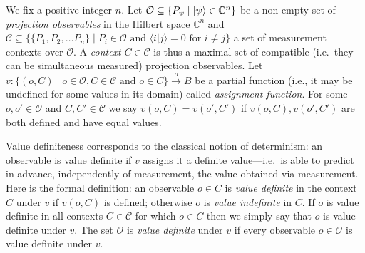 \documentclass[%
 preprint,
 showpacs,
 showkeys,
 preprintnumbers,
  amsmath,amssymb,
  aps,
 pra,
  longbibliography,
  floatfix,
 ]{revtex4-1}
\theoremstyle{plain}
\newcommand{\iprod}[2]{\langle #1 | #2 \rangle}
\begin{document}
\medskip


We fix a positive integer $n$.
Let $\mathcal{O} \subseteq \{ P_\psi \mid \ket{\psi} \in \mathbb{C}^n \}$ be a non-empty set of {\em projection observables} in the Hilbert space $\mathbb{C}^n$ and $\mathcal{C}\subseteq \{\{P_1,P_2,\dots P_n\} \mid P_i \in \mathcal{O} \text{ and } \iprod{i}{j}=0 \text{ for } i\neq j \}$ a set of measurement contexts over $\mathcal{O}$.
A {\em context} $C\in\mathcal{C}$ is thus a maximal set of compatible (i.e.\ they can be simultaneous measured) projection observables.
Let $v : \{(o,C) \mid o\in \mathcal{O}, C\in\mathcal{C}\text{ and } o\in C \} \xrightarrow{o} B$ be a partial function
(i.e., it may be undefined for some values in its domain)  called  \emph{assignment function}.
For some $o,o'\in \mathcal{O}$ and $C,C'\in\mathcal{C}$ we say $v(o,C)=v(o',C')$ if $v(o,C),v(o',C')$ are both defined and have equal values.

\medskip

 Value definiteness corresponds to the classical notion of determinism:
an observable is value definite if $v$ assigns it a definite value---i.e.\ is able to predict in advance, independently of measurement,  the value obtained via measurement. Here is the formal definition: an
 observable $o\in C$ is \emph{value definite} in the context $C$ under $v$ if $v(o,C)$ is defined;
otherwise $o$ is \emph{value indefinite} in $C$.
If $o$ is value definite in all contexts $C\in \mathcal{C}$ for which $o\in C$ then we simply say that $o$ is value definite under $v$.
The set $\mathcal{O}$ is \emph{value definite} under $v$ if every observable $o\in\mathcal{O}$ is value definite under $v$.

\medskip
\end{document}
